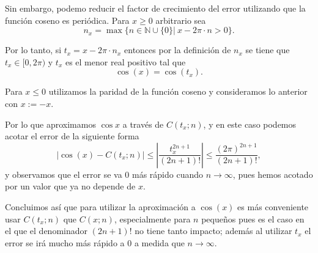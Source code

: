 \documentclass[11pt]{article}
\begin{document}
Sin embargo, podemo reducir el factor de crecimiento del error
utilizando que la función coseno es periódica. Para \(x\geq 0\)
arbitrario sea
\[ n_x=\max\{n\in\mathbb{N}\cup\{0\} |\ x-2\pi\cdot n>0\}.\]

Por lo tanto, si \(t_x=x-2\pi\cdot n_x\) entonces por la definición de
\(n_x\) se tiene que \(t_x\in [0,2\pi)\) y \(t_x\) es el menor real
positivo tal que \[ \cos(x)=\cos(t_x).\]

Para \(x\leq 0\) utilizamos la paridad de la función coseno y
consideramos lo anterior con \(x:=-x\).

Por lo que aproximamos \(\cos x\) a través de \(C(t_x;n)\), y en este
caso podemos acotar el error de la siguiente forma
\[ |\cos(x)-C(t_x;n)|\leq |\frac{t_x^{2n+1}}{(2n+1)!}|\leq \frac{(2\pi)^{2n+1}}{(2n+1)!},\]
y observamos que el error se va \(0\) más rápido cuando \(n\to \infty\),
pues hemos acotado por un valor que ya no depende de \(x\).

Concluimos así que para utilizar la aproximación a \(\cos(x)\) es más
conveniente usar \(C(t_x;n)\) que \(C(x;n)\), especialmente para \(n\)
pequeños pues es el caso en el que el denominador \((2n+1)!\) no tiene
tanto impacto; además al utilizar \(t_x\) el error se irá mucho más
rápido a \(0\) a medida que \(n\to\infty\).


    
    
    
\end{document}
